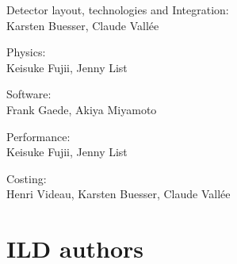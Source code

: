 \vspace*{2mm}

\noindent Detector layout, technologies and Integration:\\
Karsten Buesser, Claude Vall\'ee

\vspace*{2mm}
\noindent Physics:\\
Keisuke Fujii, Jenny List

\vspace*{2mm}
\noindent Software:\\
Frank Gaede, Akiya Miyamoto

\vspace*{2mm}
\noindent Performance:\\
Keisuke Fujii, Jenny List

\vspace*{2mm}
\noindent Costing:\\
Henri Videau, Karsten Buesser, Claude Vall\'ee


\chapter*{ ILD authors}
\newcommand{\IDRinst}[2]{\noindent  $^{\;\;\:\:#1}$\begin{minipage}[t]{0.95\textwidth}{#2}\end{minipage}\\}
\newcommand{\IDRauth}[2]{\noindent {#2}$^{#1}$,}
\newcommand{\IDRauthl}[2]{\noindent {#2}$^{#1}$}
\newcommand{\IDRinsts}[1]{\newline {\noindent{\bf #1}}\newline}

\newpage
\noindent 






%

